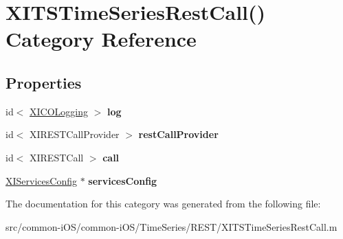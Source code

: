 \hypertarget{category_x_i_t_s_time_series_rest_call_07_08}{}\section{X\+I\+T\+S\+Time\+Series\+Rest\+Call() Category Reference}
\label{category_x_i_t_s_time_series_rest_call_07_08}
\subsection*{Properties}
\begin{DoxyCompactItemize}
\item 
\hypertarget{category_x_i_t_s_time_series_rest_call_07_08_a55e867aa103b146fda8fcc60cbf2991e}{}\label{category_x_i_t_s_time_series_rest_call_07_08_a55e867aa103b146fda8fcc60cbf2991e} 
id$<$ \hyperlink{protocol_x_i_c_o_logging-p}{X\+I\+C\+O\+Logging} $>$ {\bfseries log}
\item 
\hypertarget{category_x_i_t_s_time_series_rest_call_07_08_a55ff3d4ea73f0d5be6040e0d249b6476}{}\label{category_x_i_t_s_time_series_rest_call_07_08_a55ff3d4ea73f0d5be6040e0d249b6476} 
id$<$ X\+I\+R\+E\+S\+T\+Call\+Provider $>$ {\bfseries rest\+Call\+Provider}
\item 
\hypertarget{category_x_i_t_s_time_series_rest_call_07_08_ae6e9252461ba77e8670470a3f48a7dbf}{}\label{category_x_i_t_s_time_series_rest_call_07_08_ae6e9252461ba77e8670470a3f48a7dbf} 
id$<$ X\+I\+R\+E\+S\+T\+Call $>$ {\bfseries call}
\item 
\hypertarget{category_x_i_t_s_time_series_rest_call_07_08_a4dea59051cac1279cfb7c8f839e2f389}{}\label{category_x_i_t_s_time_series_rest_call_07_08_a4dea59051cac1279cfb7c8f839e2f389} 
\hyperlink{interface_x_i_services_config}{X\+I\+Services\+Config} $\ast$ {\bfseries services\+Config}
\end{DoxyCompactItemize}


The documentation for this category was generated from the following file\+:\begin{DoxyCompactItemize}
\item 
src/common-\/i\+O\+S/common-\/i\+O\+S/\+Time\+Series/\+R\+E\+S\+T/X\+I\+T\+S\+Time\+Series\+Rest\+Call.\+m\end{DoxyCompactItemize}
